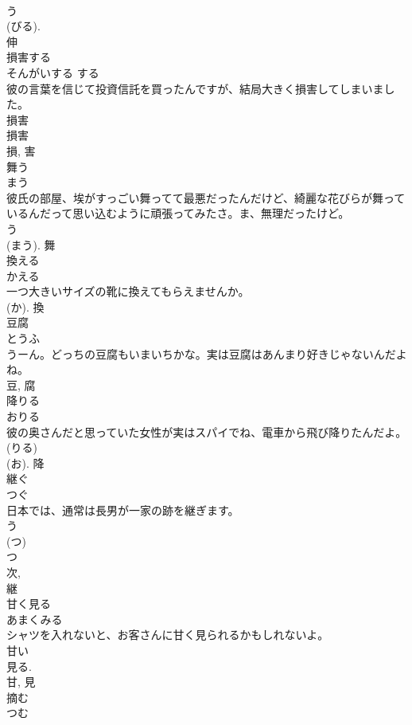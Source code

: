 \documentclass[8pt]{extreport}
\begin{document}
\begin{CJK}{UTF8}{min}
\\	う 
\\	(びる). 
\\	伸	
\\	損害する	
\\	そんがいする	する 
\\	彼の言葉を信じて投資信託を買ったんですが、結局大きく損害してしまいました。	
\\	損害 
\\	損害 
\\	損, 害	
\\	舞う	
\\	まう	
\\	彼氏の部屋、埃がすっごい舞ってて最悪だったんだけど、綺麗な花びらが舞っているんだって思い込むように頑張ってみたさ。ま、無理だったけど。	
\\	う 
\\	(まう).	舞	
\\	換える	
\\	かえる	
\\	一つ大きいサイズの靴に換えてもらえませんか。	
\\	(か).	換	
\\	豆腐	
\\	とうふ	
\\	うーん。どっちの豆腐もいまいちかな。実は豆腐はあんまり好きじゃないんだよね。	
\\	豆, 腐	
\\	降りる	
\\	おりる	
\\	彼の奥さんだと思っていた女性が実はスパイでね、電車から飛び降りたんだよ。	
\\	(りる) 
\\	(お).	降	
\\	継ぐ	
\\	つぐ	
\\	日本では、通常は長男が一家の跡を継ぎます。	
\\	う 
\\	(つ) 
\\	つ 
\\	次, 
\\	継	
\\	甘く見る	
\\	あまくみる	
\\	シャツを入れないと、お客さんに甘く見られるかもしれないよ。	
\\	甘い 
\\	見る. 
\\	甘, 見	
\\	摘む	
\\	つむ	

\end{CJK}
\end{document}
